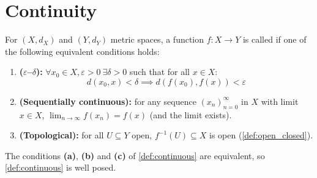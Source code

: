 
\section{Continuity}
\label{sec:continuity}

\begin{definition}
\label{def:continuous}
For $(X, d_X)$ and $(Y, d_Y)$ metric spaces, a function $f : X \to Y$ is called 
 if one of the following equivalent conditions holds:
\begin{enumerate}[label=\textbf{(\alph*)}]
  \item \textbf{($\varepsilon$--$\delta$):} $\forall x_0 \in X, \varepsilon > 0 \ \exists \delta > 0$ such that for all $x \in X$:
    \[d(x_0, x) < \delta \implies d(f(x_0), f(x)) < \varepsilon\]
  \item \textbf{(Sequentially continuous):} for any sequence $(x_n)_{n=0}^{\infty}$ in $X$ with
    limit $x \in X$, $\lim_{n\to\infty} f(x_n) = f(x)$ (and the limit exists).
  \item \textbf{(Topological):} for all $U \subseteq Y$ open, $f^{-1}(U) \subseteq X$ is open
    (\cref{def:open_closed}).
\end{enumerate}
\end{definition}


\begin{proposition}
\label{prop:continuity_equivalences}
The conditions \textbf{(a)}, \textbf{(b)} and \textbf{(c)} of \cref{def:continuous} are
equivalent, so \cref{def:continuous} is well posed.
\end{proposition}

